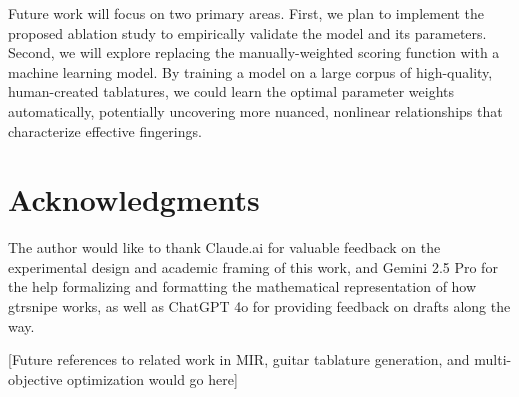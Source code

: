 \documentclass[conference]{IEEEtran}
\begin{document}
Future work will focus on two primary areas. First, we plan to implement the proposed ablation study to empirically validate the model and its parameters. Second, we will explore replacing the manually-weighted scoring function with a machine learning model. By training a model on a large corpus of high-quality, human-created tablatures, we could learn the optimal parameter weights automatically, potentially uncovering more nuanced, nonlinear relationships that characterize effective fingerings.

\section*{Acknowledgments}
The author would like to thank Claude.ai for valuable feedback on the experimental design and academic framing of this work, and Gemini 2.5 Pro for the help formalizing and formatting the mathematical representation of how gtrsnipe works, as well as ChatGPT 4o for providing feedback on drafts along the way.

\begin{thebibliography}{1}

[Future references to related work in MIR, guitar tablature generation, and multi-objective optimization would go here]

\end{thebibliography}
\end{document}
